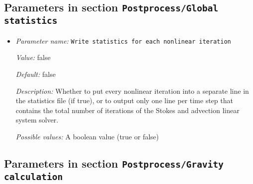 \subsection{Parameters in section \tt Postprocess/Global statistics}
\label{parameters:Postprocess/Global_20statistics}

\begin{itemize}
\item {\it Parameter name:} {\tt Write statistics for each nonlinear iteration}
\label{parameters:Postprocess/Global statistics/Write statistics for each nonlinear iteration}


{\it Value:} false


{\it Default:} false


{\it Description:} Whether to put every nonlinear iteration into a separate line in the statistics file (if true), or to output only one line per time step that contains the total number of iterations of the Stokes and advection linear system solver.


{\it Possible values:} A boolean value (true or false)
\end{itemize}

\subsection{Parameters in section \tt Postprocess/Gravity calculation}
\label{parameters:Postprocess/Gravity_20calculation}

